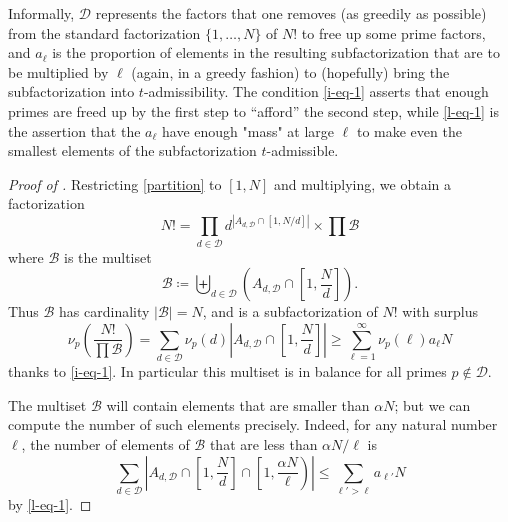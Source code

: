 \documentclass[10pt,a4paper,reqno]{amsart}
\numberwithin{equation}{section}
\theoremstyle{plain}
\theoremstyle{definition}
\newcommand\tuple{{\mathcal B}}
\begin{document}
  Informally, ${\mathcal D}$ represents the factors that one removes (as greedily as possible) from the standard factorization $\{1,\dots,N\}$ of $N!$ to free up some prime factors, and $a_\ell$ is the proportion of elements in the resulting subfactorization that are to be multiplied by $\ell$ (again, in a greedy fashion) to (hopefully) bring the subfactorization into $t$-admissibility.  The condition \eqref{i-eq-1} asserts that enough primes are freed up by the first step to ``afford'' the second step, while \eqref{l-eq-1} is the assertion that the $a_\ell$ have enough "mass" at large $\ell$ to make even the smallest elements of the subfactorization $t$-admissible.

  \begin{proof}[Proof of ]  Restricting \eqref{partition} to $[1,N]$ and multiplying, we obtain a factorization
  $$ N! = \prod_{d \in {\mathcal D}} d^{|A_{d,{\mathcal D}} \cap [1,N/d]|} \times \prod \tuple$$
  where $\tuple$ is the multiset
  $$ \tuple \coloneqq \biguplus_{d \in {\mathcal D}} \left(A_{d,{\mathcal D}} \cap \left[1,\frac{N}{d}\right]\right).$$
  Thus $\tuple$ has cardinality $|\tuple| = N$, and is a subfactorization of $N!$ with surplus
  \begin{equation}\label{p-surplus-1}
   \nu_p\left( \frac{N!}{\prod \tuple} \right) = \sum_{d \in {\mathcal D}} \nu_p(d) \left|A_{d,{\mathcal D}} \cap \left[1,\frac{N}{d}\right]\right| \geq      \sum_{\ell=1}^\infty \nu_p(\ell) a_\ell N
  \end{equation}
  thanks to \eqref{i-eq-1}.  In particular this multiset is in balance for all primes $p \not \in {\mathcal D}$.

  The multiset $\tuple$ will contain elements that are smaller than $\alpha N$; but we can compute the number of such elements  precisely.  Indeed, for any natural number $\ell$, the number of elements of $\tuple$ that are less than $\alpha N/\ell$ is
  \begin{equation}\label{N-sum-1}
    \sum_{d \in {\mathcal D}} \left|A_{d,{\mathcal D}} \cap \left[1,\frac{N}{d}\right] \cap \left[1,\frac{\alpha N}{\ell}\right)\right|
    \leq  \sum_{\ell' > \ell} a_{\ell'} N
  \end{equation}
  by \eqref{l-eq-1}.


\end{proof}
\end{document}
